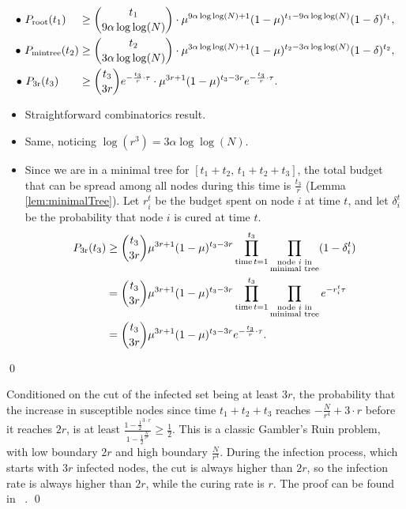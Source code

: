 \begin{proposition}
\begin{align*} 
  \bullet \,\,P_{\rm root}(t_1) \,\quad&\geq   {t_1 \choose 9\alpha\log\log(N)}  \cdot \mu^{9\alpha\log\log(N)+1} (1-\mu)^{t_1 - 9\alpha\log\log(N)} (1-\delta)^{t_1}, \\
  \bullet \,\,P_{\rm mintree}(t_2) &\geq    {t_2 \choose 3\alpha\log\log(N)}    \cdot  \mu^{3\alpha\log\log(N)+1} (1-\mu)^{t_2 - 3\alpha\log\log(N)} (1-\delta)^{t_2}, \\
    \bullet \,\, P_{\rm 3r}(t_3) \,\,\,\,\,\quad&\geq  {t_3 \choose 3 r}  e^{-\frac{t_3}{r}\cdot \tau}  \cdot  \mu^{3 r+1} (1-\mu)^{t_3 - 3 r} e^{-\frac{t_3}{r}\cdot \tau}.
    \end{align*}
\proof 
\begin{itemize}
\item Straightforward combinatorics result.
\item Same, noticing $\log(r^3) = 3\alpha\log\log(N)$.
\item Since we are in a minimal tree for $[t_1 + t_2, \, t_1 + t_2 + t_3]$, the total budget that can be spread among all nodes during this time is $\frac{t_3}{r}$ (Lemma \ref{lem:minimalTree}). Let $r_i^{t}$ be the budget spent on node $i$ at time $t$, and let $\delta_i^{t}$ be the probability that node $i$ is cured at time $t$.
\begin{align*}
P_{\rm 3r}(t_3) &\geq   {t_3 \choose 3 r}  \mu^{3 r+1} (1-\mu)^{t_3 - 3 r} \prod_{\text{time} \, t=1}^{t_3} \prod_{\substack{\text{node } i \text{ in} \\ \text{minimal tree}}} (1 - \delta_i^{t} ) \\ 
&= {t_3 \choose 3 r}  \mu^{3 r+1} (1-\mu)^{t_3 - 3 r} \prod_{\text{time} \, t=1}^{t_3} \prod_{\substack{\text{node } i \text{ in} \\ \text{minimal tree}}} e^{-r_i^{t} \tau} \\
&= {t_3 \choose 3 r}  \mu^{3 r+1} (1-\mu)^{t_3 - 3 r}  e^{-\frac{t_3}{r}\cdot \tau}.
\end{align*}
\end{itemize}
\qed 
\end{proposition}

\begin{proposition} \label{cl:Pspread} 
Conditioned on the cut of the infected set being at least $3r$, the probability that the increase in susceptible nodes since time $t_1 + t_2 + t_3$ reaches $-\frac{N}{r^4} + 3\cdot r$ before it reaches $2r$, is at least $\frac{1 - \frac{1}{2}^{3\cdot r}}{1 - \frac{1}{2}^{\frac{N}{r^4}}} \geq \frac{1}{2}$.
\proof This is a classic Gambler's Ruin problem, with low boundary $2r$ and high boundary $\frac{N}{r^4}$. During the infection process, which starts with $3r$ infected nodes, the cut is always higher than $2r$, so the infection rate is always higher than $2r$, while the curing rate is $r$. The proof can be found in ~\cite{GrimmettGeoffreyStirzaker2001}.
\qed 
\end{proposition}

